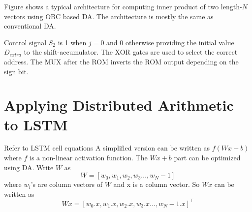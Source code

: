 Figure shows a typical architecture for computing inner product of two length-$N$ vectors using OBC based DA. The architecture is mostly the same as conventional DA.

Control signal $S_2$ is 1 when $j=0$ and 0 otherwise providing the initial value $D_{extra}$ to the shift-accumulator. The XOR gates are used to select the correct address. The MUX after the ROM inverts the ROM output depending on the sign bit.


\section{Applying Distributed Arithmetic to LSTM}
Refer to LSTM cell equations 
A simplified version can be written as $f(Wx+b)$ where $f$ is a non-linear activation function. The $Wx+b$ part can be optimized using DA. Write $W$ as
\begin{equation}
W = [w_0, w_1, w_2, w_3 ..., w_N-1]
\end{equation}
where $w_i$'s are column vectors of $W$ and x is a column vector.
So $Wx$ can be written as 
\begin{equation}
Wx = [w_0.x, w_1.x, w_2.x, w_3.x ..., w_N-1.x]^\top
\end{equation}
